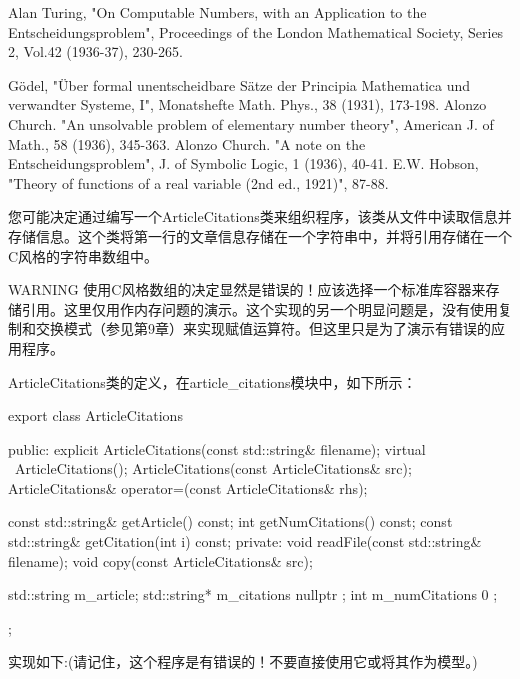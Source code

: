 \begin{shell}
Alan Turing, "On Computable Numbers, with an Application to the
Entscheidungsproblem", Proceedings of the London Mathematical Society, Series 2,
Vol.42 (1936-37), 230-265.

Gödel, "Über formal unentscheidbare Sätze der Principia Mathematica und verwandter
Systeme, I", Monatshefte Math. Phys., 38 (1931), 173-198.
Alonzo Church. "An unsolvable problem of elementary number theory", American J. of
Math., 58 (1936), 345-363.
Alonzo Church. "A note on the Entscheidungsproblem", J. of Symbolic Logic, 1
(1936), 40-41.
E.W. Hobson, "Theory of functions of a real variable (2nd ed., 1921)", 87-88.
\end{shell}


您可能决定通过编写一个ArticleCitations类来组织程序，该类从文件中读取信息并存储信息。这个类将第一行的文章信息存储在一个字符串中，并将引用存储在一个C风格的字符串数组中。

\begin{myWarning}{WARNING}
使用C风格数组的决定显然是错误的！应该选择一个标准库容器来存储引用。这里仅用作内存问题的演示。这个实现的另一个明显问题是，没有使用复制和交换模式（参见第9章）来实现赋值运算符。但这里只是为了演示有错误的应用程序。
\end{myWarning}

ArticleCitations类的定义，在article\_citations模块中，如下所示：

\begin{cpp}
export class ArticleCitations
{
    public:
        explicit ArticleCitations(const std::string& filename);
        virtual ~ArticleCitations();
        ArticleCitations(const ArticleCitations& src);
        ArticleCitations& operator=(const ArticleCitations& rhs);

        const std::string& getArticle() const;
        int getNumCitations() const;
        const std::string& getCitation(int i) const;
    private:
        void readFile(const std::string& filename);
        void copy(const ArticleCitations& src);

        std::string m_article;
        std::string* m_citations { nullptr };
        int m_numCitations { 0 };
};
\end{cpp}

实现如下:(请记住，这个程序是有错误的！不要直接使用它或将其作为模型。)

